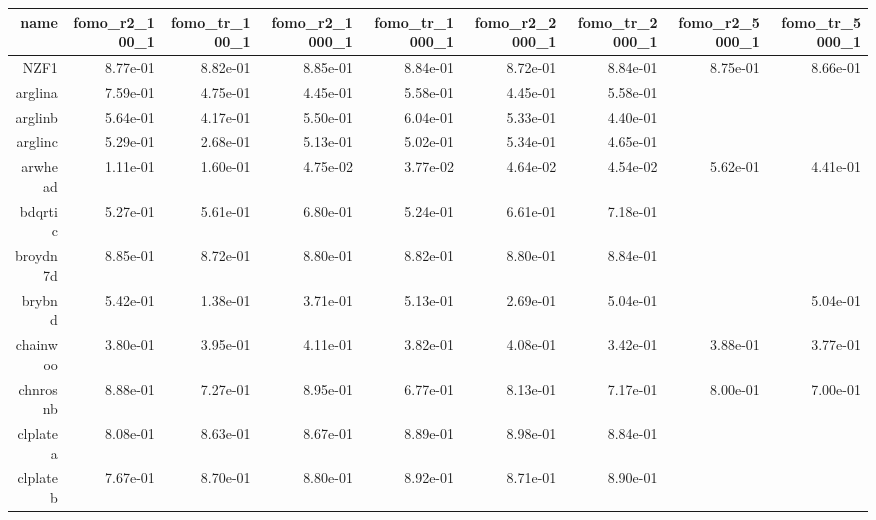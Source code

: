 \begin{tabular}{rrrrrrrrr}
  \hline
  \textbf{name} & \textbf{fomo\_r2\_100\_1} & \textbf{fomo\_tr\_100\_1} & \textbf{fomo\_r2\_1000\_1} & \textbf{fomo\_tr\_1000\_1} & \textbf{fomo\_r2\_2000\_1} & \textbf{fomo\_tr\_2000\_1} & \textbf{fomo\_r2\_5000\_1} & \textbf{fomo\_tr\_5000\_1} \\\hline
  NZF1 &  8.77e-01 &  8.82e-01 &  8.85e-01 &  8.84e-01 &  8.72e-01 &  8.84e-01 &  8.75e-01 &  8.66e-01 \\
  arglina &  7.59e-01 &  4.75e-01 &  4.45e-01 &  5.58e-01 &  4.45e-01 &  5.58e-01 & \cellcolor{black}{\color{white}{ 9.00e-01}} & \cellcolor{black}{\color{white}{ 9.00e-01}} \\
  arglinb &  5.64e-01 &  4.17e-01 &  5.50e-01 &  6.04e-01 &  5.33e-01 &  4.40e-01 & \cellcolor{black}{\color{white}{ 9.00e-01}} & \cellcolor{black}{\color{white}{ 9.00e-01}} \\
  arglinc &  5.29e-01 &  2.68e-01 &  5.13e-01 &  5.02e-01 &  5.34e-01 &  4.65e-01 & \cellcolor{black}{\color{white}{ 9.00e-01}} & \cellcolor{black}{\color{white}{ 9.00e-01}} \\
  arwhead &  1.11e-01 &  1.60e-01 &  4.75e-02 &  3.77e-02 &  4.64e-02 &  4.54e-02 &  5.62e-01 &  4.41e-01 \\
  bdqrtic &  5.27e-01 &  5.61e-01 &  6.80e-01 &  5.24e-01 &  6.61e-01 &  7.18e-01 & \cellcolor{black}{\color{white}{ 8.19e-01}} & \cellcolor{black}{\color{white}{ 8.43e-01}} \\
  broydn7d &  8.85e-01 &  8.72e-01 &  8.80e-01 &  8.82e-01 &  8.80e-01 &  8.84e-01 & \cellcolor{black}{\color{white}{ 8.81e-01}} & \cellcolor{black}{\color{white}{ 8.78e-01}} \\
  brybnd &  5.42e-01 &  1.38e-01 &  3.71e-01 &  5.13e-01 &  2.69e-01 &  5.04e-01 & \cellcolor{black}{\color{white}{ 1.78e-01}} &  5.04e-01 \\
  chainwoo &  3.80e-01 &  3.95e-01 &  4.11e-01 &  3.82e-01 &  4.08e-01 &  3.42e-01 &  3.88e-01 &  3.77e-01 \\
  chnrosnb &  8.88e-01 &  7.27e-01 &  8.95e-01 &  6.77e-01 &  8.13e-01 &  7.17e-01 &  8.00e-01 &  7.00e-01 \\
  clplatea &  8.08e-01 &  8.63e-01 &  8.67e-01 &  8.89e-01 &  8.98e-01 &  8.84e-01 & \cellcolor{black}{\color{white}{ 8.88e-01}} & \cellcolor{black}{\color{white}{ 8.87e-01}} \\
  clplateb &  7.67e-01 &  8.70e-01 &  8.80e-01 &  8.92e-01 &  8.71e-01 &  8.90e-01 & \cellcolor{black}{\color{white}{ 8.78e-01}} & \cellcolor{black}{\color{white}{ 8.86e-01}} \\

\end{tabular}
